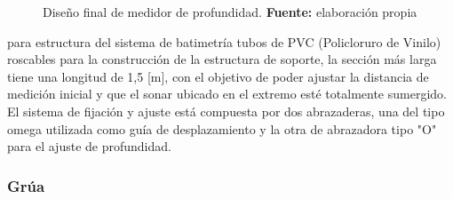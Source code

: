 \begin{figure}[h]
\centering
{}
\caption{Dise\~no final de medidor de profundidad. \textbf{Fuente:} elaboración propia}
\label{fig:batimetro}
\end{figure}

para estructura del sistema de batimetr\'ia tubos de PVC (Policloruro de Vinilo) roscables para la construcci\'on de la estructura de soporte, la secci\'on m\'as larga tiene una longitud de 1,5 [m], con el objetivo de poder ajustar la distancia de medici\'on inicial y que el sonar ubicado en el extremo est\'e totalmente sumergido. El sistema de fijaci\'on y ajuste est\'a compuesta por dos abrazaderas, una del tipo omega utilizada como gu\'ia de desplazamiento y la otra de abrazadora tipo "O" para el ajuste de profundidad. 


\subsubsection[Gr\'ua ]{Gr\'ua}




